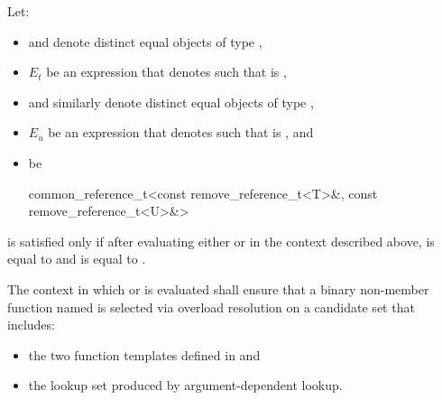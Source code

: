 \begin{itemdescr}
\pnum
Let:
\begin{itemize}
\item {} and  denote distinct equal objects of type
  ,
\item $E_t$ be an expression that denotes  such that
   is ,
\item {} and  similarly denote distinct equal objects of type
  ,
\item $E_u$ be an expression that denotes  such that
   is , and
\item {} be
  \begin{codeblock}
    common_reference_t<const remove_reference_t<T>&, const remove_reference_t<U>&>
  \end{codeblock}
\end{itemize}
 is satisfied only if after evaluating
either  or  in the context
described above,  is equal to  and  is
equal to .

\pnum
The context in which  or 
is evaluated shall ensure that a binary non-member function named  is
selected via overload resolution on a candidate set that
includes:
\begin{itemize}
\item the two  function templates defined in
   and
\item the lookup set produced by argument-dependent
  lookup.
\end{itemize}
\end{itemdescr}

